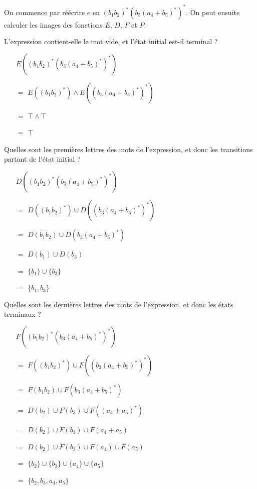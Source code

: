 \begin{correction*}
On commence par réécrire $e$ en $(b_1b_2)^*(b_3(a_4+b_5)^*)^*$. On peut ensuite calculer les images des fonctions $E$, $D$, $F$ et $P$.

L'expression contient-elle le mot vide, et l'état initial est-il terminal ?\vspace{0.3cm}

\begin{itemize}
\item[] $E((b_1b_2)^*(b_3(a_4+b_5)^*)^*)$
\item[$=$] $E((b_1b_2)^*) \wedge E((b_3(a_4+b_5)^*)^*)$
\item[$=$] $\top \wedge \top$
\item[$=$] $\top$
\end{itemize}

\vspace{0.3cm}Quelles sont les premières lettres des mots de l'expression, et donc les transitions partant de l'état initial ?\vspace{0.3cm}

\begin{itemize}
\item[] $D((b_1b_2)^*(b_3(a_4+b_5)^*)^*)$
\item[$=$] $D((b_1b_2)^*) \cup D((b_3(a_4+b_5)^*)^*)$
\item[$=$] $D(b_1b_2) \cup D(b_3(a_4+b_5)^*)$
\item[$=$] $D(b_1) \cup D(b_3)$
\item[$=$] $\{b_1\} \cup \{b_3\}$
\item[$=$] $\{b_1,b_3\}$
\end{itemize}

\vspace{0.3cm}Quelles sont les dernières lettres des mots de l'expression, et donc les états terminaux ?\vspace{0.3cm}

\begin{itemize}
\item[] $F((b_1b_2)^*(b_3(a_4+b_5)^*)^*)$
\item[$=$] $F((b_1b_2)^*) \cup F((b_3(a_4+b_5)^*)^*)$
\item[$=$] $F(b_1b_2) \cup F(b_3(a_4+b_5)^*)$
\item[$=$] $D(b_2) \cup F(b_3) \cup F((a_4+a_5)^*)$
\item[$=$] $D(b_2) \cup F(b_3) \cup F(a_4+a_5)$
\item[$=$] $D(b_2) \cup F(b_3) \cup F(a_4) \cup F(a_5)$
\item[$=$] $\{b_2\} \cup \{b_3\} \cup \{a_4\} \cup \{a_5\}$
\item[$=$] $\{b_2,b_3,a_4,a_5\}$
\end{itemize}


\end{correction*}
